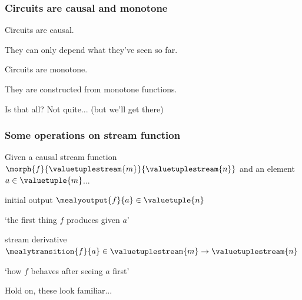 \begin{frame}
    \frametitle{Circuits are causal and monotone}

    \Large
    Circuits are \alert{causal}.

    \wait

    \normalsize
    They can only depend \alert{what they've seen so far}.

    \wait

    \Large
    Circuits are \alert{monotone}.

    \wait

    \normalsize
    They are constructed from \alert{monotone functions}.

    \wait

    Is that all?
    \wait
    \alert{Not quite...}
    \wait
    (but we'll get there)


\end{frame}
\begin{frame}
    \frametitle{Some operations on stream function}

    Given a causal stream function \(
        \morph{f}{\valuetuplestream{m}}{\valuetuplestream{n}}
    \) and an element \(a \in \valuetuple{m}\)...

    \wait

    \Large
    \alert{initial output} \quad
    \(\mealyoutput{f}{a} \in \valuetuple{n}\)

    \wait

    \normalsize
    `the first thing \(f\) produces given \(a\)'

    \wait

    \Large
    \alert{stream derivative} \quad
    \(\mealytransition{f}{a} \in \valuetuplestream{m} \to \valuetuplestream{n}\)

    \wait

    \normalsize
    `how \(f\) behaves after seeing \(a\) first'

    \vspace{1em}

    \wait
    Hold on, these look familiar...

\end{frame}
